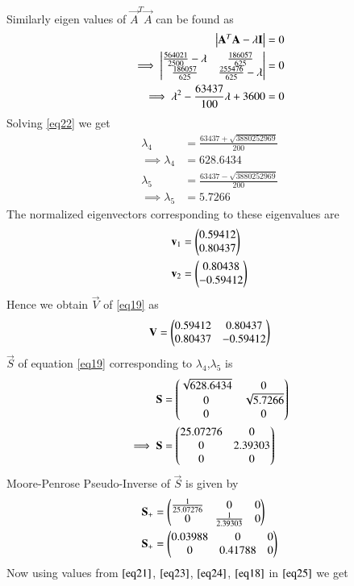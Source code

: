 \documentclass[journal,12pt,twocolumn]{IEEEtran}
\begin{document}
Similarly eigen values of $\vec{A}^T\vec{A}$ can be found as
\begin{align}
    \begin{vmatrix}\mathbf{A}^T\mathbf{A}-\lambda\mathbf{I}\end{vmatrix} &= 0\\
    \implies\begin{vmatrix}\frac{564021}{2500}-\lambda&\frac{186057}{625}\\\frac{186057}{625}&\frac{255476}{625}-\lambda\end{vmatrix}&=0\\
    \implies\lambda^2-\frac{63437}{100}\lambda+3600&=0\label{eq22}
\end{align}
Solving \eqref{eq22} we get
\begin{align}
    \lambda_4 &= \frac{63437+\sqrt{3880252969}}{200}\\
    \implies\lambda_4 &= 628.6434\\
    \lambda_5 &= \frac{63437-\sqrt{3880252969}}{200}\\
    \implies\lambda_5 &= 5.7266
\end{align}
The normalized eigenvectors corresponding to these eigenvalues are
\begin{align}
    \mathbf{v}_1 &= \begin{pmatrix}0.59412\\0.80437\end{pmatrix}\\
    \mathbf{v}_2 &= \begin{pmatrix}0.80438\\-0.59412\end{pmatrix}
\end{align}
Hence we obtain $\vec{V}$ of \eqref{eq19} as
\begin{align}
    \mathbf{V} = \begin{pmatrix}0.59412&0.80437\\0.80437&-0.59412\end{pmatrix}\label{eq23}
\end{align}
$\vec{S}$ of equation \eqref{eq19} corresponding to $\lambda_4$,$\lambda_5$ is
\begin{align}
    \mathbf{S} &= \begin{pmatrix}\sqrt{628.6434}&0\\0&\sqrt{5.7266}\\0&0\end{pmatrix}\\
    \implies\mathbf{S} &= \begin{pmatrix}25.07276&0\\0&2.39303\\0&0\end{pmatrix}
\end{align}
Moore-Penrose Pseudo-Inverse of $\vec{S}$ is given by
\begin{align}
    \mathbf{S}_+ &= \begin{pmatrix}\frac{1}{25.07276}&0&0\\0&\frac{1}{2.39303}&0\end{pmatrix}\\
    \mathbf{S}_+ &= \begin{pmatrix}0.03988&0&0\\0&0.41788&0\end{pmatrix}\label{eq24}
\end{align}
Now using values from $\eqref{eq21}$, $\eqref{eq23}$, $\eqref{eq24}$, $\eqref{eq18}$ in $\eqref{eq25}$ we get
\end{document}
